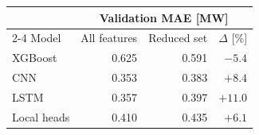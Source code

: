\begin{tabular}{lrrr}
\toprule
 & \multicolumn{3}{c}{Validation MAE [MW]} \\
\cmidrule(lr){2-4}
Model & All features & Reduced set & $\Delta$ [\%] \\
\midrule
XGBoost & 0.625 & 0.591 & $-5.4$ \\
CNN & 0.353 & 0.383 & $+8.4$ \\
LSTM & 0.357 & 0.397 & $+11.0$ \\
Local heads & 0.410 & 0.435 & $+6.1$ \\
\bottomrule
\end{tabular}
